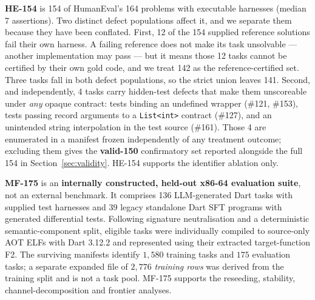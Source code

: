 \documentclass[conference]{IEEEtran}
\begin{document}
\textbf{HE-154} is 154 of HumanEval's 164 problems with executable harnesses
(median 7 assertions). Two distinct defect populations affect it, and we separate
them because they have been conflated. First, 12 of the 154 supplied reference solutions fail their own harness. A
failing reference does not make its task unsolvable --- another implementation
may pass --- but it means those 12 tasks cannot be certified by their own gold
code, and we treat 142 as the reference-certified set. Three tasks fall in both
defect populations, so the strict union leaves 141. Second, and independently, 4 tasks carry hidden-test
defects that make them unscoreable under \emph{any} opaque contract: tests
binding an undefined wrapper (\#121, \#153), tests passing record arguments to a
\texttt{List<int>} contract (\#127), and an unintended string interpolation in
the test source (\#161). Those 4 are enumerated in a manifest frozen
independently of any treatment outcome; excluding them gives the
\textbf{valid-150} confirmatory set reported alongside the full 154 in
Section~\ref{sec:validity}. HE-154 supports the identifier ablation only.

\textbf{MF-175} is an \textbf{internally constructed, held-out x86-64 evaluation
suite}, not an external benchmark. It comprises 136 LLM-generated Dart tasks with
supplied test harnesses and 39 legacy standalone Dart SFT programs with generated
differential tests. Following signature neutralisation and a deterministic
semantic-component split, eligible tasks were individually compiled to
source-only AOT ELFs with Dart 3.12.2 and represented using their extracted
target-function F2. The surviving manifests identify $1{,}580$ training tasks and
$175$ evaluation tasks; a separate expanded file of $2{,}776$ \emph{training
rows} was derived from the training split and is not a task pool. MF-175 supports
the reseeding, stability, channel-decomposition and frontier analyses.
\end{document}
